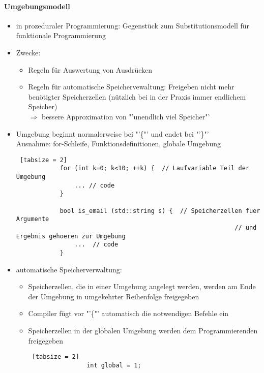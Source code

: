 \documentclass{article}
\begin{document}
	
	\paragraph{Umgebungsmodell}
	\begin{itemize}
		\item in prozeduraler Programmierung: Gegenstück zum Substitutionsmodell für funktionale Programmierung
		\item Zwecke:
		\begin{itemize}
			\item Regeln für Auswertung von Ausdrücken
			\item Regeln für automatische Speichervewaltung: Freigeben nicht mehr benötigter Speicherzellen (nützlich bei in der Praxis immer endlichem Speicher) \\
			$\Rightarrow$ bessere Approximation von "'unendlich viel Speicher"'
		\end{itemize}
		\item Umgebung beginnt normalerweise bei "'\{"' und endet bei "'\}"' \\
		Ausnahme: for-Schleife, Funktionsdefinitionen, globale Umgebung
		
		\begin{lstlisting} [tabsize = 2]
			for (int k=0; k<10; ++k) {  // Laufvariable Teil der Umgebung
				... // code 
			}
			
			bool is_email (std::string s) {  // Speicherzellen fuer Argumente 
														   	// und Ergebnis gehoeren zur Umgebung
				...  // code
			}
		\end{lstlisting}
		
		\item automatische Speicherverwaltung:
		\begin{itemize}
			\item Speicherzellen, die in einer Umgebung angelegt werden, werden am Ende der Umgebung in umgekehrter Reihenfolge freigegeben
			\item Compiler fügt vor "'\{"' automatisch die notwendigen Befehle ein
			\item Speicherzellen in der globalen Umgebung werden dem Programmierenden freigegeben
			
			\begin{lstlisting} [tabsize = 2]
				int global = 1;
				

\end{lstlisting}
\end{itemize}
\end{itemize}
\end{document}
